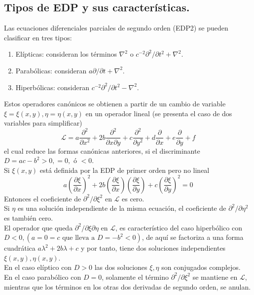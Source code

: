 \subsection{Tipos de EDP y sus características.}
Las ecuaciones diferenciales parciales de segundo orden (EDP2) se pueden clasificar en tres tipos:
\begin{enumerate}
\item Elípticas: consideran los términos $\nabla^{2}$ o $c^{-2} \partial^{2} / \partial t^{2} + \nabla^{2}$.
\item Parabólicas: consideran $a \partial / \partial t + \nabla^{2}$.
\item Hiperbólicas: consideran $c^{-2} \partial^{2} / \partial t^{2} - \nabla^{2}$.
\end{enumerate}
Estos operadores canónicos se obtienen a partir de un cambio de variable $\xi = \xi(x,y), \eta = \eta (x,y)$ en un operador lineal (se presenta el caso de dos variables para simplificar)
\begin{equation}
\mathcal{L} = a \dfrac{\partial^{2}}{\partial x^{2}} + 2b \dfrac{\partial^{2}}{\partial x \partial y} + c \dfrac{\partial^{2}}{\partial y^{2}} + d \dfrac{\partial}{\partial x} +  e \dfrac{\partial}{\partial y} +  f
\end{equation}
el cual reduce las formas canónicas anteriores, si el discriminante $D = ac - b^{2} > 0, = 0, \mbox{ ó } < 0$.
\\
Si $\xi(x,y)$ está definida por la EDP de primer orden pero no lineal
\begin{equation}
a \left(\dfrac{\partial \xi}{\partial x} \right)^{2} + 2b \left(\dfrac{\partial \xi}{\partial x} \right) \left(\dfrac{\partial \xi}{\partial y} \right) + c \left(\dfrac{\partial \xi}{\partial y} \right)^{2} = 0
\end{equation}
Entonces el coeficiente de $\partial^{2} / \partial \xi^{2}$ en $\mathcal{L}$ es cero.
\\
Si $\eta$ es una solución independiente de la misma ecuación, el coeficiente de $\partial^{2} / \partial \eta^{2}$ es también cero.
\\
El operador que queda $\partial^{2} / \partial \xi \partial \eta$ en $\mathcal{L}$, es característico del caso hiperbólico con $D<0,(a=0=c \mbox{ que lleva a } D = - b^{2} < 0)$, de aquí se factoriza a una forma cuadrática $a \lambda^{2} + 2b \lambda + c$ y por tanto, tiene dos soluciones independientes $\xi(x,y), \eta(x,y)$.
\\
En el caso elíptico con $D >0$ las dos soluciones $\xi, \eta$ son conjugados complejos.
\\
En el caso parabólico con $D=0$, solamente el término $\partial^{2} / \partial \xi^{2}$ se mantiene en $\mathcal{L}$, mientras que los términos en los otras dos derivadas de segundo orden, se anulan.

